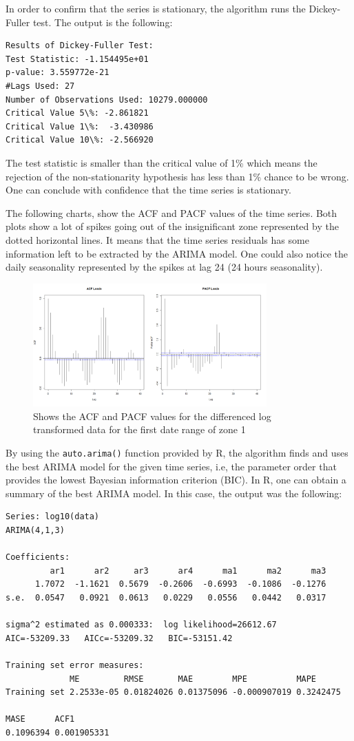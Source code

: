 \documentclass{article} %
\begin{document}
In order to confirm that the series is stationary, the algorithm runs the Dickey-Fuller test. The output is the following:
\begin{verbatim}
Results of Dickey-Fuller Test:
Test Statistic: -1.154495e+01
p-value: 3.559772e-21
#Lags Used: 27
Number of Observations Used: 10279.000000
Critical Value 5\%: -2.861821
Critical Value 1\%:  -3.430986
Critical Value 10\%: -2.566920
\end{verbatim}

The test statistic is smaller than the critical value of 1\% which means the rejection of the non-stationarity hypothesis has less than 1\% chance to be wrong. One can conclude with confidence that the time series is stationary.

The following charts, show the ACF and PACF values of the time series. Both plots show a lot of spikes going out of the insignificant zone represented by the dotted horizontal lines. It means that the time series residuals has some information left to be extracted by the ARIMA model.
One could also notice the daily seasonality represented by the spikes at lag 24 (24 hours seasonality).

\begin{figure}[H]
  \centering
    \includegraphics[width=0.80\textwidth]{ACFandPACFLoadsRaw}
  \caption{Shows the ACF and PACF values for the differenced log transformed data for the first date range of zone 1 }
\end{figure}

By using the \verb#auto.arima()# function provided by R, the algorithm finds and uses the best ARIMA model for the given time series, i.e, the parameter order that provides the lowest Bayesian information criterion (BIC).
In R, one can obtain a summary of the best ARIMA model. In this case, the output was the following:
\begin{verbatim}
Series: log10(data) 
ARIMA(4,1,3)                    

Coefficients:
         ar1      ar2     ar3      ar4      ma1      ma2      ma3
      1.7072  -1.1621  0.5679  -0.2606  -0.6993  -0.1086  -0.1276
s.e.  0.0547   0.0921  0.0613   0.0229   0.0556   0.0442   0.0317

sigma^2 estimated as 0.000333:  log likelihood=26612.67
AIC=-53209.33   AICc=-53209.32   BIC=-53151.42

Training set error measures:
             ME         RMSE       MAE        MPE          MAPE      
Training set 2.2533e-05 0.01824026 0.01375096 -0.000907019 0.3242475

MASE      ACF1
0.1096394 0.001905331
\end{verbatim}
\end{document}
